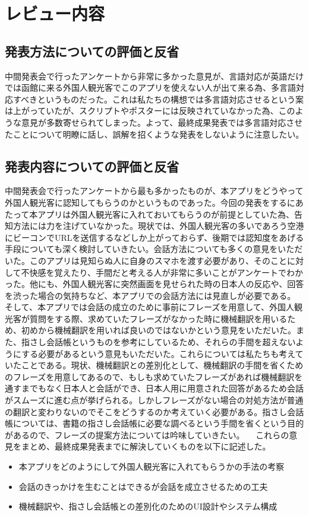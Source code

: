 \documentclass[11pt,papersize]{jsbook}
\begin{document}
\section{レビュー内容}

\subsection{発表方法についての評価と反省}
 中間発表会で行ったアンケートから非常に多かった意見が、言語対応が英語だけでは函館に来る外国人観光客でこのアプリを使えない人が出て来る為、多言語対応すべきというものだった。これは私たちの構想では多言語対応させるという案は上がっていたが、スクリプトやポスターには反映されていなかった為、このような意見が多数寄せられてしまった。よって、最終成果発表では多言語対応させたことについて明瞭に話し、誤解を招くような発表をしないように注意したい。

\subsection{発表内容についての評価と反省}
 中間発表会で行ったアンケートから最も多かったものが、本アプリをどうやって外国人観光客に認知してもらうのかというものであった。今回の発表をするにあたって本アプリは外国人観光客に入れておいてもらうのが前提としていた為、告知方法には力を注げていなかった。現状では、外国人観光客の多いであろう空港にビーコンでURLを送信するなどしか上がっておらず、後期では認知度をあげる手段についても深く検討していきたい。会話方法についても多くの意見をいただいた。このアプリは見知らぬ人に自身のスマホを渡す必要があり、そのことに対して不快感を覚えたり、手間だと考える人が非常に多いことがアンケートでわかった。他にも、外国人観光客に突然画面を見せられた時の日本人の反応や、回答を渋った場合の気持ちなど、本アプリでの会話方法には見直しが必要である。
そして、本アプリでは会話の成立のために事前にフレーズを用意して、外国人観光客が質問をする際、求めていたフレーズがなかった時に機械翻訳を用いるため、初めから機械翻訳を用いれば良いのではないかという意見をいただいた。また、指さし会話帳というものを参考にしているため、それらの手間を超えないようにする必要があるという意見もいただいた。これらについては私たちも考えていたことである。現状、機械翻訳との差別化として、機械翻訳の手間を省くためのフレーズを用意してあるので、もしも求めていたフレーズがあれば機械翻訳を通すまでもなく日本人と会話ができ、日本人用に用意された回答があるため会話がスムーズに進む点が挙げられる。しかしフレーズがない場合の対処方法が普通の翻訳と変わりないのでそこをどうするのか考えていく必要がある。指さし会話帳については、書籍の指さし会話帳に必要な調べるという手間を省くという目的があるので、フレーズの提案方法については吟味していきたい。
　これらの意見をまとめ、最終成果発表までに解決していくものを以下に記述した。
\begin{itemize}
 \item 本アプリをどのようにして外国人観光客に入れてもらうかの手法の考察
 \item 会話のきっかけを生むことはできるが会話を成立させるための工夫
 \item 機械翻訳や、指さし会話帳との差別化のためのUI設計やシステム構成
\end{itemize}
\end{document}
